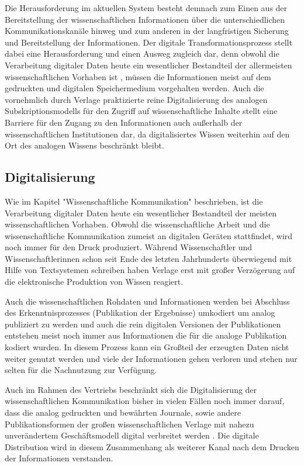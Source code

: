 Die Herausforderung im aktuellen System besteht demnach zum Einen aus der Bereitstellung der wissenschaftlichen Informationen über die unterschiedlichen Kommunikationskanäle hinweg und zum anderen in der langfristigen Sicherung und Bereitstellung der Informationen. Der digitale Transformationsprozess stellt dabei eine Herausforderung und einen Ausweg zugleich dar, denn obwohl die Verarbeitung digitaler Daten heute ein wesentlicher Bestandteil der allermeisten wissenschaftlichen Vorhaben ist \cite{winkler_2011_anforderungen}, müssen die Informationen meist auf dem gedruckten und digitalen Speichermedium vorgehalten werden. Auch die vornehmlich durch Verlage praktizierte reine Digitalisierung des analogen Subskriptionsmodells für den Zugriff auf wissenschaftliche Inhalte \cite{Hanekop_2014} \cite{boai_2012} stellt eine Barriere für den Zugang zu den Informationen auch außerhalb der wissenschaftlichen Institutionen dar, da digitalisiertes Wissen weiterhin auf den Ort des analogen Wissens beschränkt bleibt.

\subsection{Digitalisierung}

Wie im Kapitel "Wissenschaftliche Kommunikation" beschrieben, ist die Verarbeitung digitaler Daten heute ein wesentlicher Bestandteil der meisten wissenschaftlichen Vorhaben. Obwohl die wissenschaftliche Arbeit und die wissenschaftliche Kommunikation zumeist an digitalen Geräten stattfindet, wird noch immer für den Druck produziert. Während Wissenschaftler und Wissenschaftlerinnen schon seit Ende des letzten Jahrhunderts überwiegend mit Hilfe von Textsystemen schreiben \cite{Brueggemann-Klein_1995} \cite{bjork_2004_open} haben Verlage erst mit großer Verzögerung auf die elektronische Produktion von Wissen reagiert.

Auch die wissenschaftlichen Rohdaten und Informationen werden bei Abschluss des Erkenntnisprozesses (Publikation der Ergebnisse) umkodiert um analog publiziert zu werden und auch die rein digitalen Versionen der Publikationen entstehen meist noch immer aus Informationen die für die analoge Publikation kodiert wurden. In diesem Prozess kann ein Großteil der erzeugten Daten nicht weiter genutzt werden und viele der Informationen gehen verloren und stehen nur selten für die Nachnutzung zur Verfügung.

Auch im Rahmen des Vertriebs beschränkt sich die Digitalisierung der wissenschaftlichen Kommunikation bisher in vielen Fällen noch immer darauf, dass die analog gedruckten und bewährten Journale, sowie andere Publikationsformen der großen wissenschaftlichen Verlage mit nahezu unverändertem Geschäftsmodell digital verbreitet werden \cite{Hanekop_2014} \cite[:179]{Fehling_2014}. Die digitale Distribution wird in diesem Zusammenhang als weiterer Kanal nach dem Drucken der Informationen verstanden.

